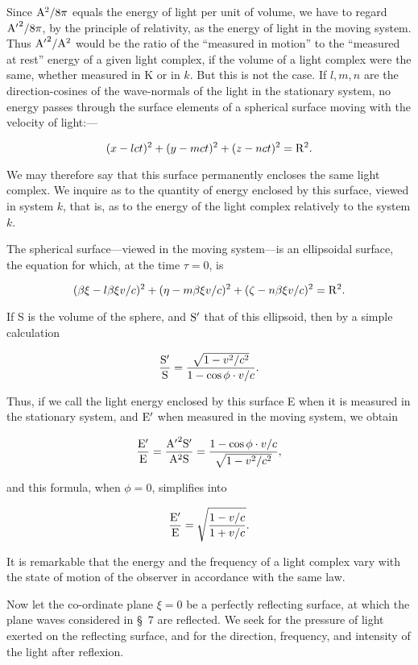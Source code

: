 \documentclass{article}
\newcommand{\pr}[1]{${\rm #1}'$}
\begin{document}
Since ${\rm A}^2/8\pi$ equals the energy of light per unit of
volume, we have to regard ${\rm A'}^2/8\pi$, by the principle of
relativity, as the energy of light in the moving system.  Thus
${\rm A'}^2/{\rm A}^2$ would be the ratio of the ``measured in
motion'' to the ``measured at rest'' energy of a given light
complex, if the volume of a light complex were the same, whether
measured in K or in $k$.  But this is not the case.  If $l, m, n$
are the direction-cosines of the wave-normals of the light in
the stationary system, no energy passes through the surface
elements of a spherical surface moving with the velocity of
light:---

\[
(x-lct)^2+(y-mct)^2+(z-nct)^2={\rm R}^2.
\]

\noindent
We may therefore say that this surface permanently encloses the same
light complex.  We inquire as to the quantity of energy enclosed by
this surface, viewed in system $k$, that is, as to the energy of the
light complex relatively to the system $k$.

The spherical surface---viewed in the moving system---is an ellipsoidal
surface, the equation for which, at the time
$\tau=0$, is

\[
(\beta\xi-l\beta\xi v/c)^2+(\eta-m\beta\xi v/c)^2+(\zeta-n\beta\xi v/c)^2={\rm R}^2.
\]

\noindent
If S is the volume of the sphere, and \pr{S} that of this ellipsoid, then
by a simple calculation

\[
\frac{\rm S'}{\rm S}=\frac{\sqrt{1-v^2/c^2}}{1-\cos\phi\cdot v/c}.
\]

\noindent
Thus, if we call the light energy enclosed by this surface E when it
is measured in the stationary system, and \pr{E} when measured in the
moving system, we obtain

\[
\frac{\rm E'}{\rm E} = \frac{{\rm A'}^2{\rm S'}}{{\rm A}^2{\rm S}} =
\frac{1-\cos\phi\cdot v/c}{\sqrt{1-v^2/c^2}},
\]

\noindent
and this formula, when $\phi=0$, simplifies into

\[
\frac{\rm E'}{\rm E} = \sqrt{\frac{1-v/c}{1+v/c}}.
\]

It is remarkable that the energy and the frequency of a light complex
vary with the state of motion of the observer in accordance with the
same law.

Now let the co-ordinate plane $\xi=0$ be a perfectly reflecting
surface, at which the plane waves considered in \S\ 7 are reflected.  We
seek for the pressure of light exerted on the reflecting surface, and
for the direction, frequency, and intensity of the light after
reflexion.
\end{document}
